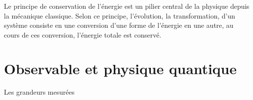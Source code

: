 Le principe de conservation de l'énergie est un pilier central de la physique depuis la mécanique classique. Selon ce principe, l'évolution, la transformation, d'un système consiste en une conversion d'une forme de l'énergie en une autre, au cours de ces conversion, l'énergie totale est conservé.

\section{Observable et physique quantique}
%
Les grandeurs mesurées

